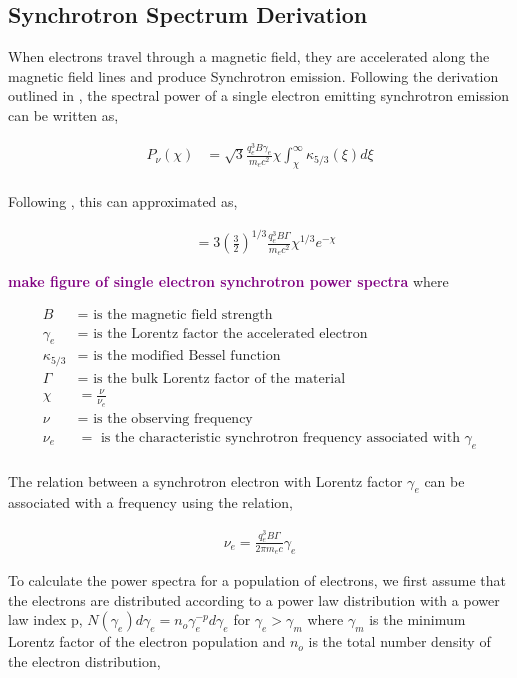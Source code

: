 \documentclass[linenumbers,twocolumn]{aastex631}
\newcommand{\mm}[1]{{\textcolor{purple}{\bf #1}}}
\begin{document}
\begin{appendix}
\section{Synchrotron Spectrum Derivation} \label{app: derive synch}

When electrons travel through a magnetic field, they are accelerated along the magnetic field lines and produce Synchrotron emission. Following the derivation outlined in \citet{1986rpa..book.....R}, the spectral power of a single electron emitting synchrotron emission can be written as,

\begin{align}
	P_{\nu}( \chi ) &= \sqrt{3} \frac{q_e^3 B \gamma_e}{m_e c^2} \chi \int_\chi^\infty \kappa_{5/3}(\xi ) d\xi \\
\end{align}

Following \citet{1973plas.book.....K}, this can approximated as, 

\begin{align}
	& = 3 \left( \frac{3}{2}\right)^{1/3} \frac{q_e^3 B \Gamma}{m_e c^2} \chi^{1/3} e^{-\chi}
\end{align}

\mm{make figure of single electron synchrotron power spectra}
where 

\begin{align}
	B &= \text{ is the magnetic field strength}\\
	\gamma_e &= \text{ is the Lorentz factor the accelerated electron}\\
	\kappa_{5/3} &= \text{ is the modified Bessel function}\\
	\Gamma &= \text{ is the bulk Lorentz factor of the material}\\
	\chi &= \frac{\nu}{\nu_e}\\
	\nu &= \text{ is the observing frequency}\\
	\nu_e &= \text{ is the characteristic synchrotron frequency associated with $\gamma_e$}\\
\end{align}

The relation between a synchrotron electron with Lorentz factor $\gamma_e$ can be associated with a frequency using the relation, 

\begin{align}
	\nu_e = \frac{q_e^3 B \Gamma}{2\pi m_e c} \gamma_e \label{eq: nu-gamma relation}
\end{align}

To calculate the power spectra for a population of electrons, we first assume that the electrons are distributed according to a power law distribution with a power law index p, $N(\gamma_e) d\gamma_e = n_o \gamma_e^{-p} d\gamma_e$ for $\gamma_e > \gamma_m$ where $\gamma_m$ is the minimum Lorentz factor of the electron population and $n_o$ is the total number density of the electron distribution,


\end{appendix}
\end{document}
